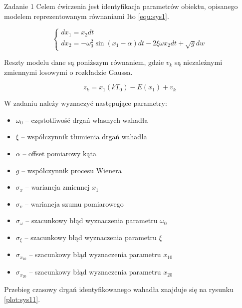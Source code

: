 \documentclass[12pt]{article}
\begin{document}
 

    
  \begin{section}{Zadanie 1}
    Celem ćwiczenia jest identyfikacja parametrów obiektu, opisanego modelem
    reprezentowanym równaniami \textrm{Ito} \ref{equ:sys1}.
    
    \begin{equation}
      \begin{cases}
        dx_1=x_2dt \\
        dx_2=-\omega_0^2\sin(x_1-\alpha)dt-2\xi\omega x_2dt+\sqrt{g}dw
      \end{cases}
      \label{equ:sys1}
    \end{equation}
    
    Reszty modelu dane są poniższym równaniem, gdzie $v_k$ są niezależnymi
    zmiennymi losowymi o rozkładzie Gaussa.
    
    \begin{equation}
      z_k=x_1(kT_0)-E(x_1)+v_k
      \label{equ:reszty}
    \end{equation}
    
    W zadaniu należy wyznaczyć następujące parametry:
    \begin{itemize}
      \item $\omega_0$ -- częstotliwość drgań własnych wahadła
      \item $\xi$ -- współczynnik tłumienia drgań wahadła
      \item $\alpha$ -- offset pomiarowy kąta
      \item $g$ -- współczynnik procesu Wienera
      \item $\sigma_{x}$ -- wariancja zmiennej $x_1$
      \item $\sigma_{v}$ -- wariancja szumu pomiarowego
      \item $\sigma_{\omega}$ -- szacunkowy błąd wyznaczenia parametru
      $\omega_0$
      \item $\sigma_{\xi}$ -- szacunkowy błąd wyznaczenia parametru $\xi$
      \item $\sigma_{x_{10}}$ -- szacunkowy błąd wyznaczenia parametru $x_{10}$
      \item $\sigma_{x_{20}}$ -- szacunkowy błąd wyznaczenia parametru $x_{20}$
    \end{itemize}
    
    \newpage
    
    Przebieg czasowy drgań identyfikowanego wahadła znajduje się na rysunku
    \ref{plot:sys11}.


\end{section}
\end{document}

